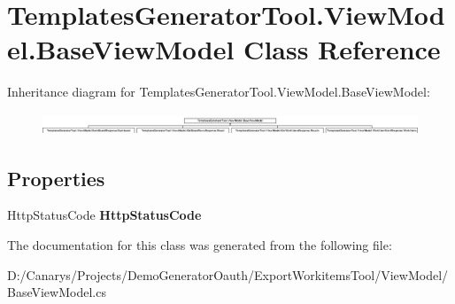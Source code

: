 \hypertarget{class_templates_generator_tool_1_1_view_model_1_1_base_view_model}{}\section{Templates\+Generator\+Tool.\+View\+Model.\+Base\+View\+Model Class Reference}
\label{class_templates_generator_tool_1_1_view_model_1_1_base_view_model}
Inheritance diagram for Templates\+Generator\+Tool.\+View\+Model.\+Base\+View\+Model\+:\begin{figure}[H]
\begin{center}
\leavevmode
\includegraphics[height=0.655738cm]{class_templates_generator_tool_1_1_view_model_1_1_base_view_model}
\end{center}
\end{figure}
\subsection*{Properties}
\begin{DoxyCompactItemize}
\item 
\mbox{\label{class_templates_generator_tool_1_1_view_model_1_1_base_view_model_a419a1f92ce6ec21394cb8b025a2c38c3}} 
Http\+Status\+Code {\bfseries Http\+Status\+Code}
\end{DoxyCompactItemize}


The documentation for this class was generated from the following file\+:\begin{DoxyCompactItemize}
\item 
D\+:/\+Canarys/\+Projects/\+Demo\+Generator\+Oauth/\+Export\+Workitems\+Tool/\+View\+Model/Base\+View\+Model.\+cs\end{DoxyCompactItemize}
